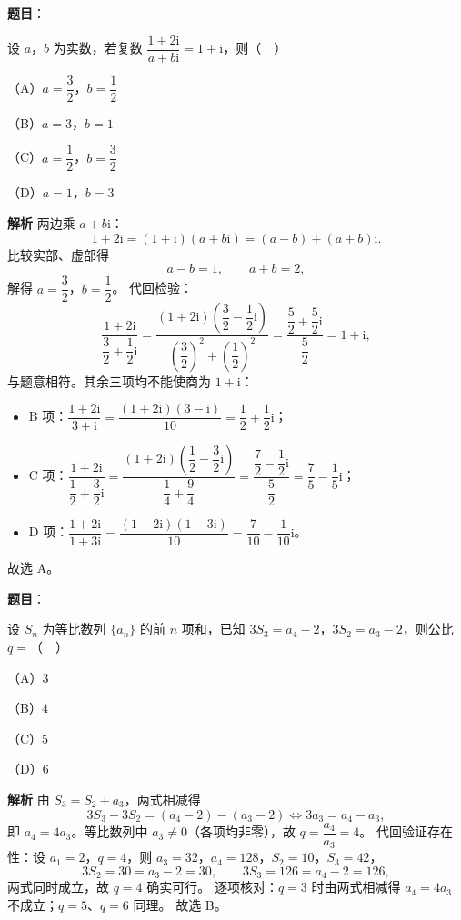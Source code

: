 \begin{answer}

\textbf{题目}：

设 $a$，$b$ 为实数，若复数 $\dfrac{1+2\mathrm i}{a+b\mathrm i}=1+\mathrm i$，则（　）

（A）$a=\dfrac32$，$b=\dfrac12$

（B）$a=3$，$b=1$

（C）$a=\dfrac12$，$b=\dfrac32$

（D）$a=1$，$b=3$

\textbf{解析}
两边乘 $a+b\mathrm i$：
\nopagebreak[4]
\[1+2\mathrm i=(1+\mathrm i)(a+b\mathrm i)=(a-b)+(a+b)\mathrm i.\]
比较实部、虚部得
\nopagebreak[4]
\[a-b=1,\qquad a+b=2,\]
解得 $a=\dfrac32$，$b=\dfrac12$。
代回检验：
\nopagebreak[4]
\[\frac{1+2\mathrm i}{\dfrac32+\dfrac12\mathrm i}
=\frac{(1+2\mathrm i)\left(\dfrac32-\dfrac12\mathrm i\right)}
{\left(\dfrac32\right)^2+\left(\dfrac12\right)^2}
=\frac{\dfrac52+\dfrac52\mathrm i}{\dfrac52}=1+\mathrm i,\]
与题意相符。其余三项均不能使商为 $1+\mathrm i$：
\begin{itemize}
\item B 项：$\dfrac{1+2\mathrm i}{3+\mathrm i}=\dfrac{(1+2\mathrm i)(3-\mathrm i)}{10}=\dfrac12+\dfrac12\mathrm i$；
\item C 项：$\dfrac{1+2\mathrm i}{\dfrac12+\dfrac32\mathrm i}=\dfrac{(1+2\mathrm i)\left(\dfrac12-\dfrac32\mathrm i\right)}{\dfrac14+\dfrac94}=\dfrac{\dfrac72-\dfrac12\mathrm i}{\dfrac52}=\dfrac75-\dfrac15\mathrm i$；
\item D 项：$\dfrac{1+2\mathrm i}{1+3\mathrm i}=\dfrac{(1+2\mathrm i)(1-3\mathrm i)}{10}=\dfrac7{10}-\dfrac1{10}\mathrm i$。
\end{itemize}
故选 A。


\end{answer}
\begin{answer}

\textbf{题目}：

设 $S_n$ 为等比数列 $\{a_n\}$ 的前 $n$ 项和，已知 $3S_3=a_4-2$，$3S_2=a_3-2$，则公比 $q=$（　）

（A）$3$

（B）$4$

（C）$5$

（D）$6$

\textbf{解析}
由 $S_3=S_2+a_3$，两式相减得
\nopagebreak[4]
\[3S_3-3S_2=(a_4-2)-(a_3-2)\iff3a_3=a_4-a_3,\]
即 $a_4=4a_3$。等比数列中 $a_3\neq0$（各项均非零），故 $q=\dfrac{a_4}{a_3}=4$。
代回验证存在性：设 $a_1=2$，$q=4$，则 $a_3=32$，$a_4=128$，$S_2=10$，$S_3=42$，
\nopagebreak[4]
\[3S_2=30=a_3-2=30,\qquad 3S_3=126=a_4-2=126,\]
两式同时成立，故 $q=4$ 确实可行。
逐项核对：$q=3$ 时由两式相减得 $a_4=4a_3$ 不成立；$q=5$、$q=6$ 同理。
故选 B。


\end{answer}
